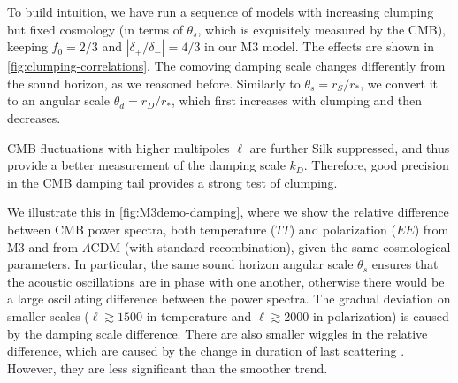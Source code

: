 To build intuition, we have run a sequence of models with increasing clumping but fixed cosmology (in terms of $\theta_s$, which is exquisitely measured by the CMB), keeping $f_0=2/3$ and $\left| \delta_+/\delta_- \right|=4/3$ in our M3 model. %
The effects are shown in \cref{fig:clumping-correlations}.
The comoving damping scale changes differently from the sound horizon, as we reasoned before.
Similarly to $\theta_s=r_S/r_*$, we convert it to an angular scale $\theta_d=r_D/r_*$, which first increases with clumping and then decreases.

CMB fluctuations with higher multipoles $\ell$ are further Silk suppressed, and thus provide a better measurement of the damping scale $k_D$. 
Therefore, good precision in the CMB damping tail provides a strong test of clumping.

We illustrate this in \cref{fig:M3demo-damping}, where we show the relative difference between CMB power spectra, both temperature ($TT$) and polarization ($EE$) from M3 and from $\Lambda$CDM (with standard recombination), given the same cosmological parameters.
In particular, the same sound horizon angular scale $\theta_s$ ensures that the acoustic oscillations are in phase with one another, otherwise there would be a large oscillating difference between the power spectra.
The gradual deviation on smaller scales ($\ell\gtrsim 1500$ in temperature and $\ell\gtrsim 2000$ in polarization) is caused by the damping scale difference.
There are also smaller wiggles in the relative difference, which are caused by the change in duration of last scattering \citep{last-scattering-duration}.
However, they are less significant than the smoother trend.

